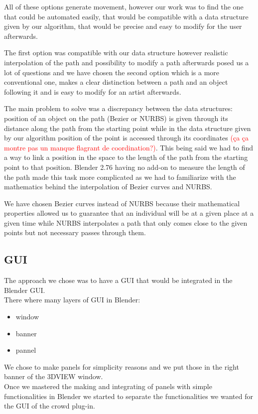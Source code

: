 All of these options generate movement, however our work was to find the one that could be automated easily, that would be compatible with a data structure given by our algorithm, that would be precise and easy to modify for the user afterwards. 

The first option was compatible with our data structure however realistic interpolation of the path and possibility to modify a path afterwards posed us a lot of questions and we have chosen the second option which is a more conventional one, makes a clear distinction between a path and an object following it and is easy to modify for an artist afterwards. 

The main problem to solve was a discrepancy between the data structures: position of an object on the path (Bezier or NURBS) is given through its distance along the path from the starting point while in the data structure given by our algorithm position of the point is accessed through its coordinates \textcolor{red}{(ça ça montre pas un manque flagrant de coordination?)}. This being said we had to find a way to link a position in the space to the length of the path from the starting point to that position. Blender 2.76 having no add-on to measure the length of the path made this task more complicated as we had to familiarize with the mathematics behind the interpolation of Bezier curves and NURBS.   

We have chosen Bezier curves instead of NURBS because their mathematical properties allowed us to guarantee that an individual will be at a given place at a given time while NURBS interpolates a path that only comes close to the given points but not necessary passes through them.

\subsection{GUI}
The approach we chose was to have a GUI that would be integrated in the Blender GUI.\\
There where many layers of GUI in Blender:
\begin{itemize}
\item window
\item banner
\item pannel
\end{itemize}

We chose to make panels for simplicity reasons and we put those in the right banner of the 3DVIEW window.\\
Once we mastered the making and integrating of panels with simple functionalities in Blender we started to separate the functionalities we wanted for the GUI of the crowd plug-in.

